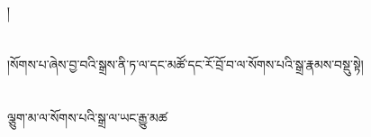 །\chapter{ }།སོགས་པ་ཞེས་བྱ་བའི་སྒྲས་ནི་ཏ་ལ་དང་མཚོ་དང་རོ་བྲོ་བ་ལ་སོགས་པའི་སྒྲ་རྣམས་བསྡུ་སྟེ།\chapter{ }ལྕུག་མ་ལ་སོགས་པའི་སྒྲ་ལ་ཡང་རྒྱུ་མཚ